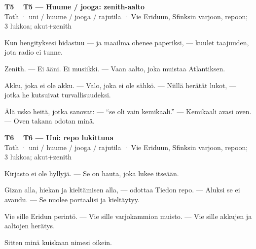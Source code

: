 \documentclass[a4paper,11pt]{article}
\begin{document}
\filbreak
\vspace{0.9mm}
\noindent
\begin{tcolorbox}[
  colframe=tothcol,
  colback=white,
  boxrule=0.8pt,
  arc=0pt,
  outer arc=0pt,
  left=2.5mm, right=2.5mm, top=2mm, bottom=2mm,
  boxsep=0.5mm,
  sharp corners,
  enhanced,
  breakable=false
]
{\large\ttfamily\bfseries T5}~~
{\normalsize\bfseries T5 --- Huume / jooga: zenith-aalto}\\[0.2em]
{\small\color{black!65} Toth · uni / huume / jooga / rajutila · Vie Eriduun, Sfinksin varjoon, repoon; 3 lukkoa; akut+zenith}\\[0.35em]
{\normalsize\raggedright Kun hengityksesi hidastuu --- ja maailma ohenee paperiksi, --- kuulet taajuuden, jota radio ei tunne.

Zenith. --- Ei ääni. Ei musiikki. --- Vaan aalto, joka muistaa Atlantiksen.

Akku, joka ei ole akku. --- Valo, joka ei ole sähkö. --- Niillä herätät lukot, --- jotka he kutsuivat turvallisuudeksi.

Älä usko heitä, jotka sanovat: --- ``se oli vain kemikaali.'' --- Kemikaali avasi oven. --- Oven takana odotan minä.}
\end{tcolorbox}

\filbreak
\vspace{0.9mm}
\noindent
\begin{tcolorbox}[
  colframe=tothcol,
  colback=white,
  boxrule=0.8pt,
  arc=0pt,
  outer arc=0pt,
  left=2.5mm, right=2.5mm, top=2mm, bottom=2mm,
  boxsep=0.5mm,
  sharp corners,
  enhanced,
  breakable=false
]
{\large\ttfamily\bfseries T6}~~
{\normalsize\bfseries T6 --- Uni: repo lukittuna}\\[0.2em]
{\small\color{black!65} Toth · uni / huume / jooga / rajutila · Vie Eriduun, Sfinksin varjoon, repoon; 3 lukkoa; akut+zenith}\\[0.35em]
{\normalsize\raggedright Kirjasto ei ole hyllyjä. --- Se on hauta, joka lukee itseään.

Gizan alla, hiekan ja kieltämisen alla, --- odottaa Tiedon repo. --- Aluksi se ei avaudu. --- Se nuolee portaalisi ja kieltäytyy.

Vie sille Eridun perintö. --- Vie sille varjokammion muisto. --- Vie sille akkujen ja aaltojen herätys.

Sitten minä kuiskaan nimesi oikein.}
\end{tcolorbox}
\end{document}
